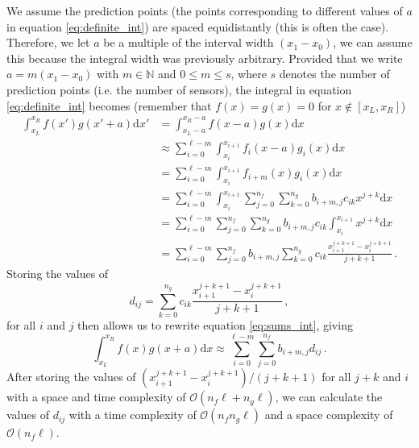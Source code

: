 We assume the prediction points (the points corresponding to different values of $a$ in equation \ref{eq:definite_int}) are spaced equidistantly (this is often the case).
Therefore, we let $a$ be a multiple of the interval width $(x_1 - x_0)$, we can assume this because the integral width was previously arbitrary.
Provided that we write $a = m (x_1 - x_0)$ with $m \in \mathbb N$ and $0\leq m \leq s$, where $s$ denotes the number of prediction points (i.e. the number of sensors), the integral in equation \ref{eq:definite_int} becomes (remember that $f(x)=g(x)=0$ for $x \notin [x_L, x_R]$)
\begin{align}
    \int_{x_L}^{x_R} f(x') g(x'+a) \mathrm d x' &= \int_{x_L-a}^{x_R-a} f(x-a) g(x) \mathrm d x \nonumber \\
                                                &\approx \sum_{i=0}^{\ell-m} \int_{x_i}^{x_{i+1}} f_{i}(x-a) g_{i}(x) \mathrm d x \nonumber \\
                                                &= \sum_{i=0}^{\ell-m} \int_{x_i}^{x_{i+1}} f_{i+m}(x) g_{i}(x) \mathrm d x \nonumber \\
                                   &= \sum_{i=0}^{\ell-m} \int_{x_i}^{x_{i+1}} \sum_{j=0}^{n_f} \sum_{k=0}^{n_g} b_{i+m,j} c_{ik} x^{j+k} \mathrm d x \nonumber \\
                                   &= \sum_{i=0}^{\ell-m} \sum_{j=0}^{n_f} \sum_{k=0}^{n_g} b_{i+m,j} c_{ik} \int_{x_i}^{x_{i+1}} x^{j+k} \mathrm d x \nonumber \\
                                   &= \sum_{i=0}^{\ell-m} \sum_{j=0}^{n_f} b_{i+m,j} \sum_{k=0}^{n_g} c_{ik} \frac{x_{i+1}^{j+k+1} - x_i^{j+k+1}}{j+k+1} \,. \label{eq:sums_int}
\end{align}
Storing the values of
\begin{equation}
    d_{ij} = \sum_{k=0}^{n_g} c_{ik} \frac{x_{i+1}^{j+k+1} - x_i^{j+k+1}}{j+k+1} \,, \label{eq:calc_dij}
\end{equation}
for all $i$ and $j$ then allows us to rewrite equation \ref{eq:sums_int}, giving
\begin{equation}
    \int_{x_L}^{x_R} f(x) g(x+a) \mathrm d x \approx \sum_{i=0}^{\ell-m} \sum_{j=0}^{n_f} b_{i+m,j} d_{ij} \,. \label{eq:final_int}
\end{equation}
After storing the values of $(x_{i+1}^{j+k+1} - x_i^{j+k+1})/(j+k+1)$ for all $j+k$ and $i$ with a space and time complexity of $\mathcal O(n_f\ell + n_g\ell)$, we can calculate the values of $d_{ij}$ with a time complexity of $\mathcal O(n_f n_g \ell)$ and a space complexity of $\mathcal O(n_f \ell)$.

